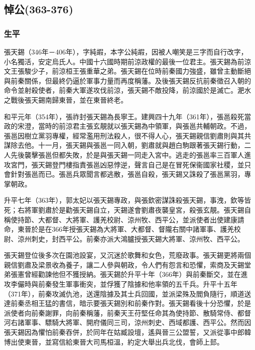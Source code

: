 
\subsection{悼公\tiny(363-376)}

\subsubsection{生平}

張天錫（346年－406年），字純嘏，本字公純嘏，因被人嘲笑是三字而自行改字，小名獨活，安定烏氏人。中國十六國時期前涼政權的最後一位君主。張天錫為前涼文王張駿少子，前涼桓王張重華之弟。張天錫在位時前秦國力強盛，雖曾主動斷絕與前秦關係，但最終仍逼於軍事力量而再度稱藩。及後張天錫反抗前秦徵召入朝的命令並射殺使者，前秦大軍遂攻伐前涼，張天錫不敵投降，前涼國於是滅亡。淝水之戰後張天錫南歸東晉，並在東晉終老。

和平元年（354年），張祚封張天錫為長寧王。建興四十九年（361年），張邕殺死當政的宋澄，當時的前涼君主張玄靚就以張天錫為中領軍，與張邕共輔朝政。不過，張邕因樹立黨羽專權，經常濫用刑法殺人，很不得人心，張天錫親信劉肅則與其共謀除去他。十一月，張天錫與張邕一同入朝，劉肅就與趙白駒跟著張天錫行動，二人先後襲擊張邕但都失敗，於是與張天錫一同走入宮中。逃走的張邕率三百軍人進攻宮門，張天錫登門樓指責張邕凶惡悖逆，聲言自己是在冒死保衞國家社稷，並只會針對張邕而已。張邕兵眾聞言都逃散，張邕自殺，張天錫又誅殺了張邕黨羽，專掌朝政。

升平七年（363年），郭太妃以張天錫專政，與張欽密謀誅殺張天錫，事洩，欽等皆死；右將軍劉肅於是勸張天錫自立，天錫遂會劉肅夜襲皇宮，殺張玄靚。張天錫自稱使持節、大都督、大將軍、護羌校尉、涼州牧、西平公，並派使者出使建康請命，東晉於是在366年授張天錫為大將軍、大都督、督隴右關中諸軍事、護羌校尉、涼州刺史，封西平公。前秦亦派大鴻臚授張天錫大將軍、涼州牧、西平公。

張天錫登位後多次在園池設宴，又沉迷於歌舞和女色，荒廢政事。張天錫更將兩個親信劉肅及梁景收為養子，讓二人參與朝政，令人們有怨言和恐懼，索商及天錫堂弟張憲曾經勸諫他但不獲授納。張天錫於升平十年（366年）與前秦斷交，並在進攻李儼時與前秦發生軍事衝突，並俘獲了陰據和他率領的五千兵。升平十五年（371年），前秦攻滅仇池，送還陰據及其士兵回國，並派梁殊及閻負隨行，順道送達前秦丞相王猛的書信，暗示要張天錫別和前秦作對。張天錫看後十分恐懼，於是派使者向前秦謝罪，向前秦稱藩，前秦天王苻堅任命其為使持節、散騎常侍、都督河右諸軍事、驃騎大將軍、開府儀同三司，涼州刺史、西域都護、西平公。然而因張天錫因為懼怕前秦吞併，於同年在姑臧設壇，遙與晉三公盟誓，又派從事中郎韓博出使東晉，並寫信給東晉大司馬桓溫，約定大舉出兵北伐，會師上邽。

